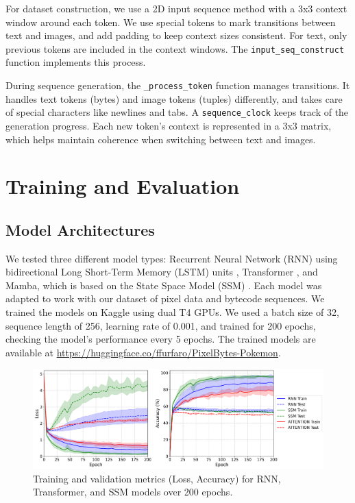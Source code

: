 \documentclass[10pt,a4paper]{article}
\begin{document}
For dataset construction, we use a 2D input sequence method with a 3x3 context window around each token. We use special tokens to mark transitions between text and images, and add padding to keep context sizes consistent. For text, only previous tokens are included in the context windows. The \texttt{input\_seq\_construct} function implements this process.

During sequence generation, the \texttt{\_process\_token} function manages transitions. It handles text tokens (bytes) and image tokens (tuples) differently, and takes care of special characters like newlines and tabs. A \texttt{sequence\_clock} keeps track of the generation progress. Each new token's context is represented in a 3x3 matrix, which helps maintain coherence when switching between text and images.

\section{Training and Evaluation}

\subsection{Model Architectures}
We tested three different model types: Recurrent Neural Network (RNN) using bidirectional Long Short-Term Memory (LSTM) units \cite{hochreiter1997long}, Transformer \cite{vaswani2017attention}, and Mamba, which is based on the State Space Model (SSM) \cite{gu2022efficiently}. Each model was adapted to work with our dataset of pixel data and bytecode sequences. We trained the models on Kaggle using dual T4 GPUs. We used a batch size of 32, sequence length of 256, learning rate of 0.001, and trained for 200 epochs, checking the model's performance every 5 epochs. The trained models are available at \url{https://huggingface.co/ffurfaro/PixelBytes-Pokemon}.

\begin{figure}[htbp]
\centering
\includegraphics[width=\textwidth]{training_results.png}
\caption{Training and validation metrics (Loss, Accuracy) for RNN, Transformer, and SSM models over 200 epochs.}
\label{fig:training_results}
\end{figure}
\end{document}
